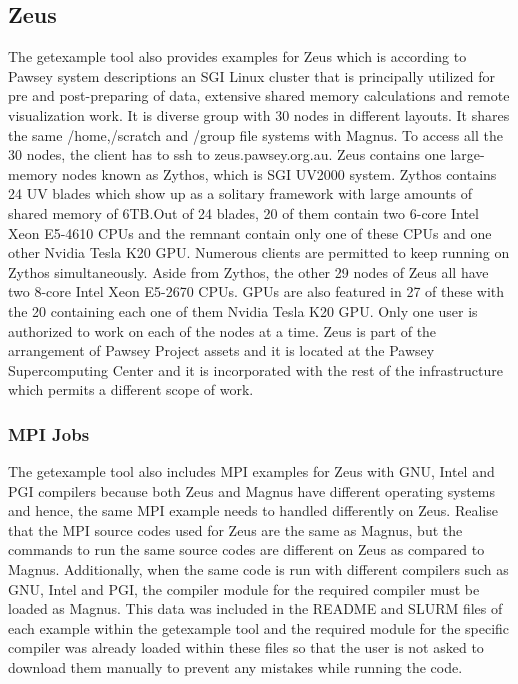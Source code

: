 \documentclass[journal]{IEEEtran}
\begin{document}
\subsection{Zeus}

The getexample tool also provides examples for Zeus which is according to Pawsey system descriptions an SGI Linux cluster that is principally utilized 
for pre and post-preparing of data, extensive shared memory calculations and remote visualization work. It is diverse group with 30 nodes in different layouts. It shares the same /home,/scratch and 
/group file systems with Magnus. To access all the 30 nodes, the client has to ssh to zeus.pawsey.org.au.
Zeus contains one large-memory nodes known as Zythos, which is SGI UV2000 system. Zythos contains 24 UV blades which show up as a solitary framework 
with large amounts of shared memory of 6TB.Out of 24 blades, 20 of them contain two 6-core Intel Xeon E5-4610 CPUs and the remnant contain only one of 
these CPUs and one other Nvidia Tesla K20 GPU. Numerous clients are permitted to keep running on Zythos simultaneously. Aside from Zythos, the other 29 
nodes of Zeus all have two 8-core Intel Xeon E5-2670 CPUs. GPUs are also featured in 27 of these with the 20 containing each one of them Nvidia Tesla 
K20 GPU. Only one user is authorized to work on each of the nodes at a time. Zeus is part of the arrangement of Pawsey Project assets and it is located at 
the Pawsey Supercomputing Center and it is incorporated with the rest of the infrastructure which permits a different scope of work.
 


\subsubsection{MPI Jobs}

The getexample tool also includes MPI examples for Zeus with GNU, Intel and PGI compilers because both Zeus and Magnus have different operating systems 
and hence, the same MPI example needs to handled differently on Zeus. Realise that the MPI source codes used for Zeus are the same
as Magnus, but the commands to run the same source codes are different on Zeus as compared to Magnus. Additionally, when the same code is run 
with different compilers such as GNU, Intel and PGI, the compiler module for the required compiler must be loaded as Magnus. This data was
included in the README and SLURM files of each example within the getexample tool and the required module for the specific compiler was already loaded 
within these files so that the user is not asked to download them manually to prevent any mistakes while running the code.
\end{document}
